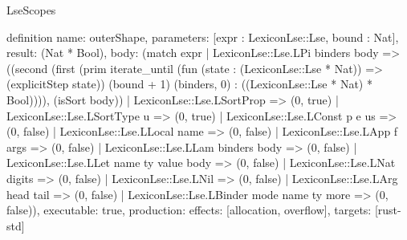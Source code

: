 \begin{lexlean}{LseScopes}
\begin{semanticmodule}
definition{
  name: outerShape,
  parameters: [expr : LexiconLse::Lse, bound : Nat],
  result: (Nat * Bool),
  body: (match expr
    | LexiconLse::Lse.LPi binders body => ((second (first (prim iterate_until (fun (state : (LexiconLse::Lse * Nat)) => (explicitStep state)) (bound + 1) (binders, 0) : ((LexiconLse::Lse * Nat) * Bool)))), (isSort body))
    | LexiconLse::Lse.LSortProp => (0, true)
    | LexiconLse::Lse.LSortType u => (0, true)
    | LexiconLse::Lse.LConst p e us => (0, false)
    | LexiconLse::Lse.LLocal name => (0, false)
    | LexiconLse::Lse.LApp f args => (0, false)
    | LexiconLse::Lse.LLam binders body => (0, false)
    | LexiconLse::Lse.LLet name ty value body => (0, false)
    | LexiconLse::Lse.LNat digits => (0, false)
    | LexiconLse::Lse.LNil => (0, false)
    | LexiconLse::Lse.LArg head tail => (0, false)
    | LexiconLse::Lse.LBinder mode name ty more => (0, false)),
  executable: true,
  production: {effects: [allocation, overflow], targets: [rust-std]}
}
\end{semanticmodule}
\end{lexlean}
